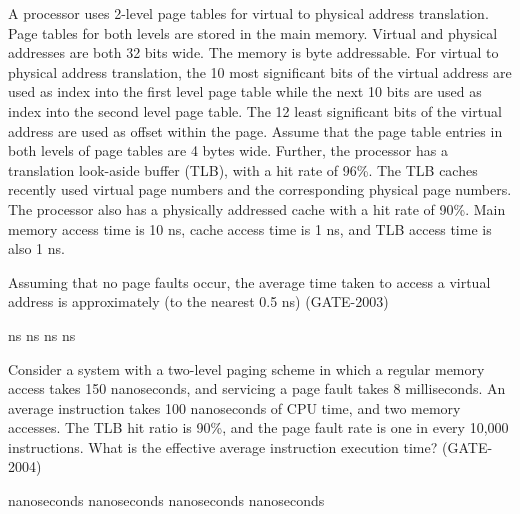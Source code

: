 
\begin{questyle}

  \question  A processor uses 2-level page tables for virtual to physical address translation. Page tables for
             both levels are stored in the main memory. Virtual and physical addresses are both 32 bits wide.
             The memory is byte addressable. For virtual to physical address translation, the 10 most significant
             bits of the virtual address are used as index into the first level page table while the next 10 bits
             are used as index into the second level page table. The 12 least significant bits of the virtual
             address are used as offset within the page. Assume that the page table entries in both levels of
             page tables are 4 bytes wide. Further, the processor has a translation look-aside buffer (TLB), with a
             hit rate of 96\%. The TLB caches recently used virtual page numbers and the corresponding physical
             page numbers. The processor also has a physically addressed cache with a hit rate of 90\%.
             Main memory access time is 10 ns, cache access time is 1 ns, and TLB access time is also 1 ns.

            Assuming that no page faults occur, the average time taken to access a virtual address is
            approximately (to the nearest 0.5 ns) (GATE-2003)

            \begin{choices}
               ns
               ns
               ns
               ns
            \end{choices}

\end{questyle}


\begin{questyle}

  \question  Consider a system with a two-level paging scheme in which a regular memory access takes 150
             nanoseconds, and servicing a page fault takes 8 milliseconds. An average instruction takes
             100 nanoseconds of CPU time, and two memory accesses. The TLB hit ratio is 90\%, and the
             page fault rate is one in every 10,000 instructions. What is the effective average
             instruction execution time? (GATE-2004)

  \begin{choices}
     nanoseconds
     nanoseconds
     nanoseconds
     nanoseconds
  \end{choices}

\end{questyle}

